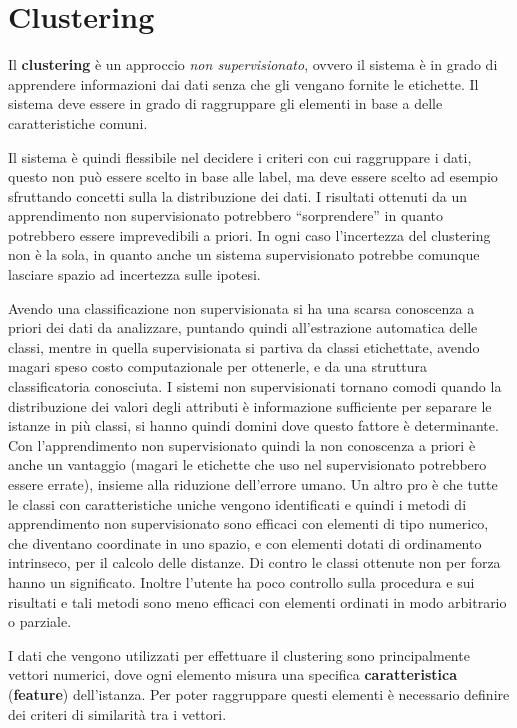 \chapter{Clustering}
Il \textbf{clustering} è un approccio \textit{non supervisionato}, ovvero il sistema è in grado di apprendere informazioni dai dati senza che gli vengano fornite le etichette. Il sistema deve essere in grado di raggruppare gli elementi in base a delle caratteristiche comuni.  

Il sistema è quindi flessibile nel decidere i criteri con cui raggruppare i dati, questo non può essere scelto in base alle label, ma deve essere scelto ad esempio sfruttando concetti sulla la distribuzione dei dati. I risultati ottenuti da un apprendimento non supervisionato potrebbero “sorprendere” in quanto potrebbero essere imprevedibili a priori. In ogni caso l'incertezza del clustering non è la sola, in quanto anche un sistema supervisionato potrebbe comunque lasciare spazio ad incertezza sulle ipotesi.

Avendo una classificazione non supervisionata si ha una scarsa conoscenza a priori dei dati da analizzare, puntando quindi all'estrazione automatica delle classi, mentre in quella supervisionata si partiva da classi etichettate, avendo magari speso costo computazionale per ottenerle, e da una struttura classificatoria conosciuta. I sistemi non supervisionati tornano comodi quando la distribuzione dei valori degli attributi è informazione sufficiente per separare le istanze in più classi, si hanno quindi domini dove questo fattore è determinante. Con l'apprendimento non supervisionato quindi la non conoscenza a priori è anche un vantaggio (magari le etichette che uso nel supervisionato potrebbero essere errate), insieme alla riduzione dell'errore umano. Un altro pro è che tutte le classi con caratteristiche uniche vengono identificati e quindi i metodi di apprendimento non supervisionato sono efficaci con elementi di tipo numerico, che diventano coordinate in uno spazio, e con elementi dotati di ordinamento intrinseco, per il calcolo delle distanze. Di contro le classi ottenute non per forza hanno un significato. Inoltre l'utente ha poco controllo sulla procedura e sui risultati e tali metodi sono meno efficaci con elementi ordinati in modo arbitrario o parziale.

I dati che vengono utilizzati per effettuare il clustering sono principalmente vettori numerici, dove ogni elemento misura una specifica \textbf{caratteristica} (\textbf{feature}) dell'istanza. Per poter raggruppare questi elementi è necessario definire dei criteri di similarità tra i vettori. 

